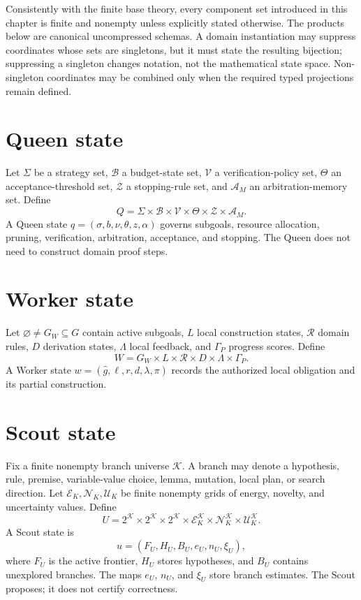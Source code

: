 \documentclass[11pt,oneside]{book}
\theoremstyle{remark}
\begin{document}
Consistently with the finite base theory, every component set introduced in
this chapter is finite and nonempty unless explicitly stated otherwise.
The products below are canonical uncompressed schemas. A domain
instantiation may suppress coordinates whose sets are singletons, but it must
state the resulting bijection; suppressing a singleton changes notation, not
the mathematical state space. Non-singleton coordinates may be combined only
when the required typed projections remain defined.

\section{Queen state}

Let $\Sigma$ be a strategy set, $\mathcal B$ a budget-state set, $\mathcal V$ a verification-policy set, $\Theta$ an acceptance-threshold set, $\mathcal Z$ a stopping-rule set, and $\mathcal A_M$ an arbitration-memory set. Define
\[
Q=\Sigma\times\mathcal B\times\mathcal V\times\Theta\times\mathcal Z\times\mathcal A_M.
\]
A Queen state $q=(\sigma,b,\nu,\theta,z,\alpha)$ governs subgoals, resource allocation, pruning, verification, arbitration, acceptance, and stopping. The Queen does not need to construct domain proof steps.

\section{Worker state}

Let $\varnothing\ne G_W\subseteq G$ contain active subgoals, $L$ local
construction states, $\mathcal R$ domain rules, $D$ derivation states,
$\Lambda$ local feedback, and $\Gamma_P$ progress scores. Define
\[
W=G_W\times L\times\mathcal R\times D\times\Lambda\times\Gamma_P.
\]
A Worker state $w=(\widehat g,\ell,r,d,\lambda,\pi)$ records the authorized local obligation and its partial construction.

\section{Scout state}

Fix a finite nonempty branch universe $\mathcal K$. A branch may denote a
hypothesis, rule, premise, variable-value choice, lemma, mutation, local plan,
or search direction. Let $\mathcal E_K,\mathcal N_K,\mathcal U_K$ be finite
nonempty grids of energy, novelty, and uncertainty values. Define
\[
U=2^{\mathcal K}\times2^{\mathcal K}\times2^{\mathcal K}
\times\mathcal E_K^{\mathcal K}\times\mathcal N_K^{\mathcal K}\times\mathcal U_K^{\mathcal K}.
\]
A Scout state is
\[
u=(F_U,H_U,B_U,e_U,n_U,\xi_U),
\]
where $F_U$ is the active frontier, $H_U$ stores hypotheses, and $B_U$
contains unexplored branches. The maps $e_U$, $n_U$, and $\xi_U$ store branch
estimates. The Scout proposes; it does not certify correctness.
\end{document}
